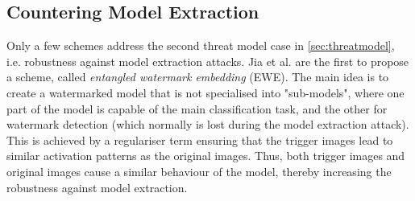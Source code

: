 \subsection{Countering Model Extraction} \label{sec:wm:countering_extraction}
Only a few schemes address the second threat model case in \cref{sec:threatmodel}, i.e. robustness against model extraction attacks. %
Jia et al. \cite{jia_entangled_2020} are the first to propose a scheme, called \textit{entangled watermark embedding} (EWE). %
The main idea is to create a watermarked model that is not specialised into "sub-models", where one part of the model is capable of the main classification task, and the other for watermark detection (which normally is lost during the model extraction attack). This is achieved by a regulariser term ensuring that the trigger images lead to similar activation patterns as the original images. Thus, both trigger images and original images cause a similar behaviour of the model, thereby increasing the robustness against model extraction.  

